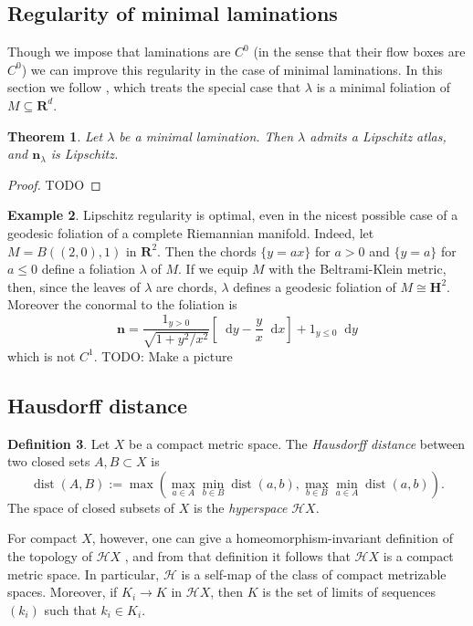 \documentclass[reqno,11pt]{amsart}
\newcommand{\RR}{\mathbf{R}}
\newcommand{\Hyp}{\mathbf H}
\newcommand*\dif{\mathop{}\!\mathrm{d}}
\DeclareMathOperator{\dist}{dist}
\newcommand{\Hypspace}{\mathscr H}
\newcommand{\normal}{\mathbf n}
\newcommand{\dfn}[1]{\emph{#1}\index{#1}}
\newtheorem{theorem}{Theorem}[section]
\theoremstyle{definition}
\newtheorem{definition}[theorem]{Definition}
\newtheorem{example}[theorem]{Example}
\numberwithin{equation}{section}
\begin{document}

\subsection{Regularity of minimal laminations}\label{RegularitySec}
Though we impose that laminations are $C^0$ (in the sense that their flow boxes are $C^0$) we can improve this regularity in the case of minimal laminations.
In this section we follow \cite{Solomon86}, which treats the special case that $\lambda$ is a minimal foliation of $M \subseteq \RR^d$.

\begin{theorem}\label{regularity theorem}
Let $\lambda$ be a minimal lamination. Then $\lambda$ admits a Lipschitz atlas, and $\normal_\lambda$ is Lipschitz.
\end{theorem}
\begin{proof}
TODO
\end{proof}

\begin{example}
Lipschitz regularity is optimal, even in the nicest possible case of a geodesic foliation of a complete Riemannian manifold.
Indeed, let $M = B((2, 0), 1)$ in $\RR^2$. Then the chords $\{y = ax\}$ for $a > 0$ and $\{y = a\}$ for $a \leq 0$ define a foliation $\lambda$ of $M$.
If we equip $M$ with the Beltrami-Klein metric, then, since the leaves of $\lambda$ are chords, $\lambda$ defines a geodesic foliation of $M \cong \Hyp^2$.
Moreover the conormal to the foliation is
$$\normal = \frac{1_{y > 0}}{\sqrt{1 + y^2/x^2}} \left[\dif y - \frac{y}{x} \dif x\right] + 1_{y \leq 0} \dif y$$
which is not $C^1$.
TODO: Make a picture
\end{example}


\subsection{Hausdorff distance}

\begin{definition}
Let $X$ be a compact metric space. The \dfn{Hausdorff distance} between two closed sets $A, B \subset X$ is
$$\dist(A, B) := \max\left(\max_{a \in A} \min_{b \in B} \dist(a, b), \max_{b \in B} \min_{a \in A} \dist(a, b)\right).$$
The space of closed subsets of $X$ is the \dfn{hyperspace} $\Hypspace X$.
\end{definition}

For compact $X$, however, one can give a homeomorphism-invariant definition of the topology of $\Hypspace X$ \cite[Chapter 4]{nadler2017continuum}, and from that definition it follows that $\Hypspace X$ is a compact metric space.
In particular, $\Hypspace$ is a self-map of the class of compact metrizable spaces.
Moreover, if $K_i \to K$ in $\Hypspace X$, then $K$ is the set of limits of sequences $(k_i)$ such that $k_i \in K_i$.
\end{document}
